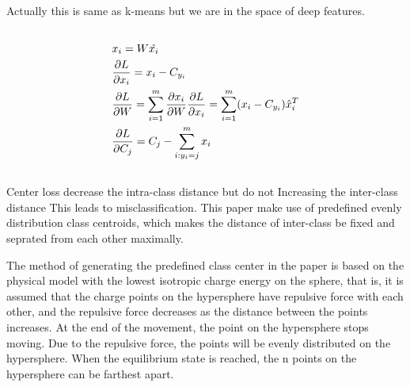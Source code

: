 \documentclass{article}
\begin{document}
Actually this is same as k-means but we are in the space of deep features.


\subsection{}
\begin{align*}
    &x_i = W \hat{x_i} \\
    &\pdv{L}{x_i} = x_i - C_{y_i} \\
    &\pdv{L}{W} = \sum_{i = 1}^{m} \pdv{x_i}{W} \pdv{L}{x_i} 
    = \sum_{i = 1}^{m} (x_i - C_{y_i})\hat{x}_i^T \\
    &\pdv{L}{C_j} = C_{j} - \sum_{i: y_i = j}^{m}x_i
\end{align*}
\subsection{}
Center loss decrease the intra-class distance but do not Increasing the inter-class
distance This leads to misclassification. This paper make use of predefined evenly 
distribution class centroids, which makes the distance of inter-class be fixed and 
seprated from each other maximally.

The method of generating the predefined class center in the paper is based on the physical
model with the lowest isotropic charge energy on the sphere, that is, it is assumed that the charge
points on the hypersphere have repulsive force with each other, and the repulsive force decreases as
the distance between the points increases. At the end of the movement, the point on the hypersphere
stops moving. Due to the repulsive force, the points will be evenly distributed on the hypersphere.
When the equilibrium state is reached, the n points on the hypersphere can be farthest apart.
\end{document}
